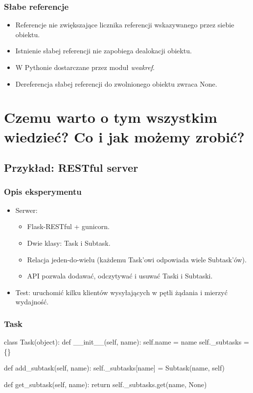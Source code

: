 \documentclass{beamer}
\begin{document}
    \begin{frame}
        \frametitle{Słabe referencje}
        \begin{itemize}
            \item Referencje nie zwiększające licznika referencji wskazywanego przez siebie obiektu.
            \item Istnienie słabej referencji nie zapobiega dealokacji obiektu.
            \item W Pythonie dostarczane przez moduł \textit{weakref}.
            \item Dereferencja słabej referencji do zwolnionego obiektu zwraca None.
        \end{itemize}
    \end{frame}


\section{Czemu warto o tym wszystkim wiedzieć? Co i jak możemy zrobić?}
\frame\sectionpage
\subsection{Przykład: RESTful server}
\frame\subsectionpage
    \begin{frame}
        \frametitle{Opis eksperymentu}
        \begin{itemize}
            \item Serwer:
            \begin{itemize}
                \item Flask-RESTful + gunicorn.
                \item Dwie klasy: Task i Subtask.
                \item Relacja jeden-do-wielu (każdemu Task'owi odpowiada wiele Subtask'ów).
                \item API pozwala dodawać, odczytywać i usuwać Taski i Subtaski.
            \end{itemize}
            \item Test: uruchomić kilku klientów wysyłających w pętli żądania i mierzyć wydajność.
        \end{itemize}
    \end{frame}

    \begin{frame}[fragile]
        \frametitle{Task}
        \begin{semiverbatim}
class Task(object):
    def __init__(self, name):
        self.name = name
        self._subtasks = \{\}

    def add_subtask(self, name):
        self._subtasks[name] = Subtask(name, self)

    def get_subtask(self, name):
        return self._subtasks.get(name, None)
        \end{semiverbatim}
\end{frame}
\end{document}
